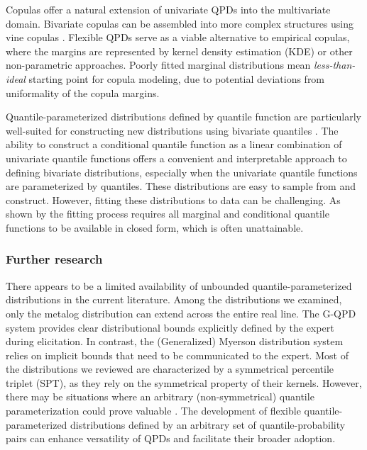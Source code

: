 \documentclass[
  fleqn,
  deca,
  blindrev
]{informs4}
\begin{document}
Copulas offer a natural extension of univariate QPDs into the
multivariate domain. Bivariate copulas can be assembled into more
complex structures using vine copulas
\citep{czado2019AnalyzingDependentData, kurowicka2011DependenceModelingVine, wilson2018SpecificationInformativePrior}.
Flexible QPDs serve as a viable alternative to empirical copulas, where
the margins are represented by kernel density estimation (KDE) or other
non-parametric approaches. Poorly fitted marginal distributions mean
\emph{less-than-ideal} starting point for copula modeling, due to
potential deviations from uniformality of the copula margins.

Quantile-parameterized distributions defined by quantile function are
particularly well-suited for constructing new distributions using
bivariate quantiles
\citep{nair2023PropertiesBivariateDistributions, vineshkumar2019BivariateQuantileFunctions}.
The ability to construct a conditional quantile function as a linear
combination of univariate quantile functions offers a convenient and
interpretable approach to defining bivariate distributions, especially
when the univariate quantile functions are parameterized by quantiles.
These distributions are easy to sample from and construct. However,
fitting these distributions to data can be challenging. As shown by
\citet{castillo1997FittingContinuousBivariate} the fitting process
requires all marginal and conditional quantile functions to be available
in closed form, which is often unattainable.

\subsubsection*{Further research}\label{further-research}

There appears to be a limited availability of unbounded
quantile-parameterized distributions in the current literature. Among
the distributions we examined, only the metalog distribution can extend
across the entire real line. The G-QPD system provides clear
distributional bounds explicitly defined by the expert during
elicitation. In contrast, the (Generalized) Myerson distribution system
relies on implicit bounds that need to be communicated to the expert.
Most of the distributions we reviewed are characterized by a symmetrical
percentile triplet (SPT), as they rely on the symmetrical property of
their kernels. However, there may be situations where an arbitrary
(non-symmetrical) quantile parameterization could prove valuable
\citep[as shown by][]{perepolkin2021HybridElicitationIndirect}. The
development of flexible quantile-parameterized distributions defined by
an arbitrary set of quantile-probability pairs can enhance versatility
of QPDs and facilitate their broader adoption.
\end{document}
